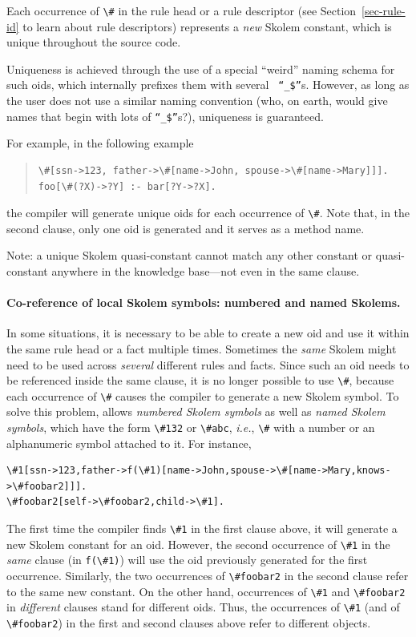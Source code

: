 \documentclass[11pt]{article}
\newcommand{\ERGO}{\mbox{\smaller{\ensuremath{\cal{E}}\smaller{{\sc{RGO}}}}}\xspace}
\newcommand{\FLSYSTEM}{\ERGO}
\newcommand{\bs}{\textbackslash}
\begin{document}
Each occurrence of \verb|\#| in the rule head or a rule descriptor (see
Section~\ref{sec-rule-id} to learn about rule descriptors)
represents a \emph{new} Skolem constant, which is unique throughout
the source code.

Uniqueness is achieved through the use of a special ``weird'' naming
schema for such oids, which internally prefixes them with several {\tt
  ``\_\$''}s. However, as long as the user does not use a similar
naming convention (who, on earth, would give names that begin with lots of
{\tt ``\_\$''}s?), uniqueness is guaranteed.


For example, in the following example
\begin{quote}
\begin{verbatim}
\#[ssn->123, father->\#[name->John, spouse->\#[name->Mary]]].
foo[\#(?X)->?Y] :- bar[?Y->?X].
\end{verbatim}
\end{quote}
the compiler will generate unique oids for each occurrence of {\tt \bs{}\#}.
Note that, in the second clause, only one oid is generated and it serves as
a method name.

Note: a unique Skolem quasi-constant cannot match any other constant or
quasi-constant anywhere in the knowledge base---not even in the same
clause.


\paragraph{Co-reference of local Skolem symbols: numbered and named Skolems.}
In some situations, it is necessary to be able to create a new oid and use it
within the same rule head or a fact multiple times. Sometimes the \emph{same}
Skolem might need to be used across \emph{several} different rules and facts.
Since such an oid 
needs to be referenced inside the same  clause, it is no longer
possible to use \verb|\#|, because each occurrence of \verb|\#| causes the
compiler to generate a new Skolem symbol.
To solve this problem, \FLSYSTEM allows 
\emph{numbered Skolem symbols} as well as \emph{named Skolem symbols},
which have the form \verb|\#132| or \verb|\#abc|, {\it i.e.}, \verb|\#|
with a number or an alphanumeric symbol attached to it. For instance, 
\begin{verbatim}
\#1[ssn->123,father->f(\#1)[name->John,spouse->\#[name->Mary,knows->\#foobar2]]].
\#foobar2[self->\#foobar2,child->\#1].
\end{verbatim}
The first time the compiler finds \verb|\#1| in the first clause above,
it will generate a new Skolem constant for an
oid.
However, the second occurrence of \verb|\#1|
in the \emph{same} clause (in \verb|f(\#1)|)  will use the oid
previously generated for the first occurrence.
Similarly, the two occurrences of \verb|\#foobar2|
in the second clause refer to the same new constant.
On the other hand,
occurrences of \verb|\#1| and \verb|\#foobar2|
in \emph{different} clauses stand for
different oids. Thus, the occurrences of \verb|\#1| (and of \verb|\#foobar2|)
in the first and second
clauses above refer to different objects.
\end{document}
